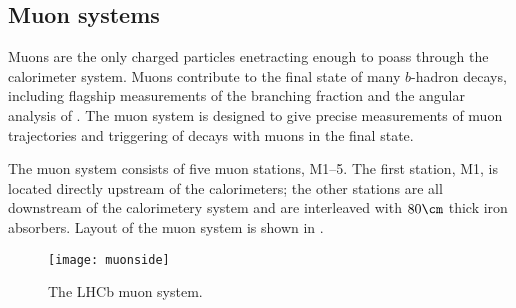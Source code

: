 \subsection{Muon systems}



Muons are the only charged particles enetracting enough to poass through the calorimeter system.
Muons contribute to the final state of many $b$-hadron decays, including  flagship
measurements of  the branching fraction \decay{\Bs}{\mumu} and the angular analysis of
\decay{\Bd}{\Kstarz\mumu}.
The muon system is designed to give precise measurements of muon trajectories and triggering of
decays with muons in the final state.

The muon system consists of five muon stations, M1--5.
The first station, M1, is located directly upstream of the calorimeters; the other stations are all
downstream of the calorimetery system and are interleaved with $80\cm$ thick iron absorbers.
Layout of the \lhcb muon system is shown in .

\begin{figure}
  \begin{center}
    \texttt{[image: muonside]}
    \caption[LHCb muon system]
    {\small
      The LHCb muon system.
    }
    \label{fig:lhcb:muonside}
  \end{center}
\end{figure}


